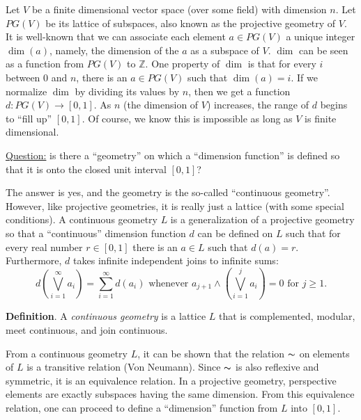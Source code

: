 \documentclass[12pt]{article}
\begin{document}
Let $V$ be a finite dimensional vector space (over some field) with dimension $n$.  Let $PG(V)$ be its lattice of subspaces, also known as the projective geometry of $V$.  It is well-known that we can associate each element $a\in PG(V)$ a unique integer $\dim(a)$, namely, the dimension of the $a$ as a subspace of $V$.  $\dim$ can be seen as a function from $PG(V)$ to $\mathbb{Z}$.  One property of $\dim$ is that for every $i$ between $0$ and $n$, there is an $a\in PG(V)$ such that $\dim(a)=i$.  If we normalize $\dim$ by dividing its values by $n$, then we get a function $d: PG(V)\to [0,1]$.  As $n$ (the dimension of $V$) increases, the range of $d$ begins to ``fill up'' $[0,1]$.  Of course, we know this is impossible as long as $V$ is finite dimensional.

\underline{Question:} is there a ``geometry'' on which a ``dimension function'' is defined so that it is onto the closed unit interval $[0,1]$?

The answer is yes, and the geometry is the so-called ``continuous geometry''.  However, like projective geometries, it is really just a lattice (with some special conditions).  A continuous geometry $L$ is a generalization of a projective geometry so that a ``continuous'' dimension function $d$ can be defined on $L$ such that for every real number $r\in [0,1]$ there is an $a\in L$ such that $d(a)=r$.  Furthermore, $d$ takes infinite independent joins to infinite sums: $$d(\bigvee_{i=1}^{\infty} a_i)=\sum_{i=1}^{\infty} d(a_i)\mbox{ whenever }a_{j+1}\wedge (\bigvee_{i=1}^{j} a_i)=0\mbox{ for }j\ge 1.$$

\textbf{Definition}.  A \emph{continuous geometry} is a lattice $L$ that is complemented, modular, meet continuous, and join continuous.

From a continuous geometry $L$, it can be shown that the  relation $\thicksim$ on elements of $L$ is a transitive relation (Von Neumann).  Since $\thicksim$ is also reflexive and symmetric, it is an equivalence relation.  In a projective geometry, perspective elements are exactly subspaces having the same dimension.  From this equivalence relation, one can proceed to define a ``dimension'' function from $L$ into $[0,1]$.
\end{document}
